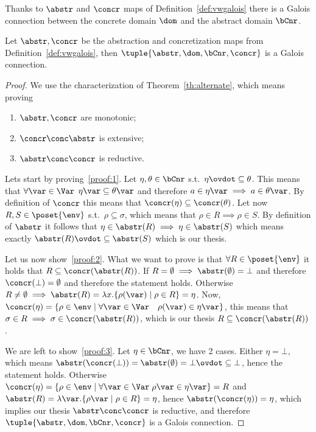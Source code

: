 Thanks to \(\abstr\) and \(\concr\) maps of
Definition~\ref{def:vwgalois} there is a Galois connection between
the concrete domain \(\dom\) and the abstract domain \(\bCnr\).

\begin{lemma}
  Let \(\abstr, \concr\) be the abstraction and concretization maps
  from Definition~\ref{def:vwgalois}, then
  \(\tuple{\abstr, \dom, \bCnr, \concr}\) is a Galois connection.
\end{lemma}

\begin{proof}
  We use the characterization of Theorem~\ref{th:alternate}, which
  means proving
  \begin{enumerate}[label=(\roman*)]
  \item\label{proof:1} \(\abstr,\concr\) are monotonic;
  \item\label{proof:2} \(\concr \conc \abstr\) is extensive;
  \item\label{proof:3} \(\abstr\conc\concr\) is reductive.
  \end{enumerate}

  Lets start by proving~\ref{proof:1}. Let \(\eta, \theta \in \bCnr\)
  s.t.\ \(\eta\ovdot\subseteq\theta\). This means that
  \(\forall \var\in\Var\) \(\eta\var \subseteq \theta\var\) and
  therefore \(a\in\eta\var \implies a\in\theta\var\). By definition of
  \(\concr\) this means that
  \(\concr(\eta) \subseteq \concr(\theta)\). Let now
  \(R, S \in \poset{\env}\) s.t.\ \(\rho \subseteq \sigma\), which
  means that \(\rho \in R \implies \rho \in S\). By definition of
  \(\abstr\) it follows that
  \(\eta \in \abstr(R) \implies \eta \in \abstr(S)\) which means
  exactly \(\abstr(R) \ovdot\subseteq \abstr(S)\) which is our thesis.

  Let us now show~\ref{proof:2}. What we want to prove is that
  \(\forall R\in\poset{\env}\) it holds that
  \(R \subseteq \concr(\abstr(R))\). If
  \(R = \emptyset \implies \abstr(\emptyset) = \bot\) and therefore
  \(\concr(\bot) = \emptyset\) and therefore the statement
  holds. Otherwise
  \(R \neq \emptyset \implies \abstr(R) = \lambda x . \{\rho(\var)
  \mid \rho \in R\} = \eta\). Now,
  \(\concr(\eta) = \{\rho \in \env \mid \forall \var\in\Var \quad
  \rho(\var) \in \eta\var\}\), this means that
  \(\sigma \in R \implies \sigma \in \concr(\abstr(R))\), which is our
  thesis \(R \subseteq \concr(\abstr(R))\).

  We are left to show~\ref{proof:3}. Let \(\eta \in \bCnr\), we have 2
  cases. Either \(\eta = \bot\), which means
  \(\abstr(\concr(\bot)) = \abstr(\emptyset) = \bot \ovdot\subseteq
  \bot\), hence the statement holds. Otherwise
  \(\concr(\eta) = \{\rho \in \env \mid \forall \var\in\Var \;
  \rho\var \in \eta\var\} = R\) and
  \(\abstr(R) = \lambda\var.\{\rho\var \mid \rho\in R\} =\eta\), hence
  \(\abstr(\concr(\eta)) = \eta\), which implies our thesis
  \(\abstr \conc \concr\) is reductive, and therefore
  \(\tuple{\abstr, \dom, \bCnr, \concr}\) is a Galois connection.
\end{proof}

